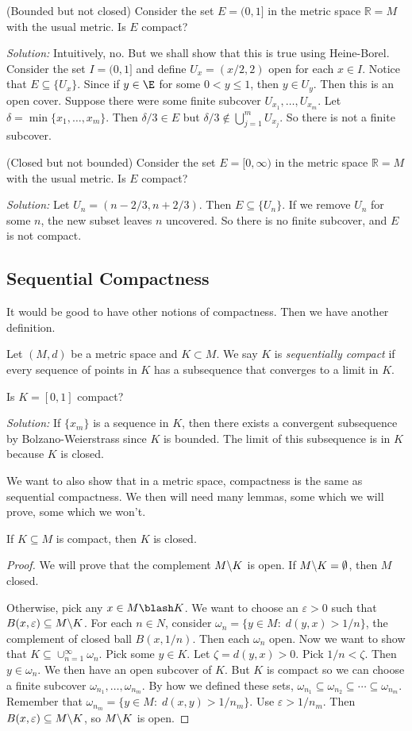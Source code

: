 \documentclass[11pt]{article}
\theoremstyle{definition}
\newcommand{\R}{\mathbb{R}}                      %
\newcommand{\bslash}{\symbol{92}}
\begin{document}
\ex (Bounded but not closed) Consider the set $E=(0,1]$ in the metric space $\R=M$ with the usual metric. Is $E$ compact?

\textit{Solution:} Intuitively, no. But we shall show that this is true using Heine-Borel. Consider the set $I=(0,1]$ and define $U_x=(x/2,2)$ open for each $x\in I$. Notice that $E\subseteq \{U_x\}$. Since if $y\in \E$ for some $0<y\leq 1$, then $y\in U_y$. Then this is an open cover. Suppose there were some finite subcover $U_{x_1},\dots,U_{x_m}$. Let $\delta=\min\{x_1,\dots,x_m\}$. Then $\delta/3\in E$ but $\delta/3 \not\in \bigcup_{j=1}^m U_{x_j}$. So there is not a finite subcover.

\ex (Closed but not bounded) Consider the set $E=[0,\infty)$ in the metric space $\R=M$ with the usual metric. Is $E$ compact?

\textit{Solution:} Let $U_n=(n-2/3,n+2/3)$. Then $E\subseteq \{U_n\}$. If we remove $U_n$ for some $n$, the new subset leaves $n$ uncovered. So there is no finite subcover, and $E$ is not compact.

\subsection{Sequential Compactness}
It would be good to have other notions of compactness. Then we have another definition.

 Let $(M,d)$ be a metric space and $K\subset M$. We say $K$ is \textit{sequentially compact} if every sequence of points in $K$ has a subsequence that converges to a limit in $K$.

\ex Is $K=[0,1]$ compact?

\textit{Solution:} If $\{x_m\}$ is a sequence in $K$, then there exists a convergent subsequence by Bolzano-Weierstrass since $K$ is bounded. The limit of this subsequence is in $K$ because $K$ is closed.

We want to also show that in a metric space, compactness is the same as sequential compactness. We then will need many lemmas, some which we will prove, some which we won't.

\lem If $K\subseteq M$ is compact, then $K$ is closed.
\begin{proof}
    We will prove that the complement $M\bslash K$ is open. If $M\bslash K=\emptyset$, then $M$ closed. 

    Otherwise, pick any $x\in M\blash K$. We want to choose an $\varepsilon>0$ such that $B(x,\varepsilon)\subseteq M\bslash K$. For each $n\in N$, consider $\omega_n=\{y\in M:\;d(y,x)>1/n\}$, the complement of closed ball $B(x,1/n)$. Then each $\omega_n$ open. Now we want to show that $K\subseteq \cup_{n=1}^\infty \omega_n$. Pick some $y\in K$. Let $\zeta = d(y,x)>0$. Pick $1/n<\zeta$. Then $y\in \omega_n$. We then have an open subcover of $K$. But $K$ is compact so we can choose a finite subcover $\omega_{n_1},\dots,\omega_{n_m}$. By how we defined these sets, $\omega_{n_1}\subseteq \omega_{n_2}\subseteq \cdots \subseteq \omega_{n_m}$. Remember that $\omega_{n_m}=\{y\in M:\; d(x,y)>1/n_m\}$. Use $\varepsilon>1/n_m$. Then $B(x,\varepsilon)\subseteq M\bslash K$, so $M\bslash K$ is open.
\end{proof}
\end{document}
